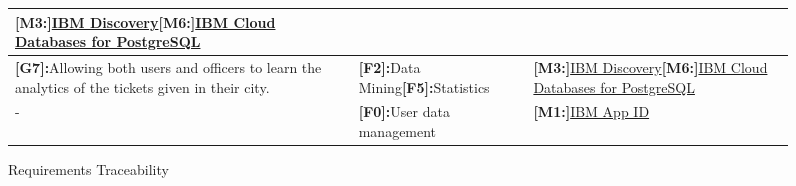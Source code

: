 \begin{figure}
\begin{center}
\begin{tabular}{|p{5cm}|p{5cm}|p{5cm}|}
\textbf{[M3:]}\hyperlink{discovery}{IBM Discovery}\newline\textbf{[M6:]}\hyperlink{postgres}{IBM Cloud Databases for PostgreSQL}\\
\hline
\textbf{[G7]:}Allowing both users and officers to learn the analytics of the tickets given in their city.
&
\textbf{[F2]:}Data Mining\newline\textbf{[F5]:}Statistics&
\textbf{[M3:]}\hyperlink{discovery}{IBM Discovery}\newline\textbf{[M6:]}\hyperlink{postgres}{IBM Cloud Databases for PostgreSQL}\\
\hline
-&\textbf{[F0]:}User data management&\textbf{[M1:]}\hyperlink{appid}{IBM App ID}\\
\hline
\end{tabular}
\end{center}
\caption{Requirements Traceability} 

\end{figure}